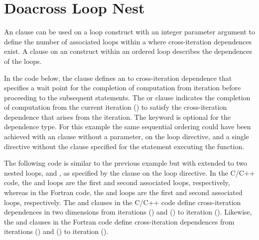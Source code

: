 \pagebreak
\section{Doacross Loop Nest}
\label{sec:doacross}

An  clause can be used on a loop construct with an integer
parameter argument to define the number of associated loops within 
a  where cross-iteration dependences exist.
A  clause on an  construct within an ordered 
loop describes the dependences of the  loops. 

In the code below, the  clause defines an  
to  cross-iteration dependence that specifies a wait point for 
the completion of computation from iteration  before proceeding 
to the subsequent statements. The  
or  clause indicates 
the completion of computation from the current iteration () 
to satisfy the cross-iteration dependence that arises from the iteration.
The  keyword is optional for the 
dependence type.
For this example the same sequential ordering could have been achieved 
with an  clause without a parameter, on the loop directive, 
and a single  directive without the  clause
specified for the statement executing the  function.



The following code is similar to the previous example but with 
 extended to two nested loops,  and , 
as specified by the  clause on the loop directive. 
In the C/C++ code, the  and  loops are the first and
second associated loops, respectively, whereas
in the Fortran code, the  and  loops are the first and
second associated loops, respectively.
The  and  clauses in 
the C/C++ code define cross-iteration dependences in two dimensions from 
iterations () and () to iteration ().  
Likewise, the  and  clauses 
in the Fortran code define cross-iteration dependences from iterations 
() and () to iteration ().

